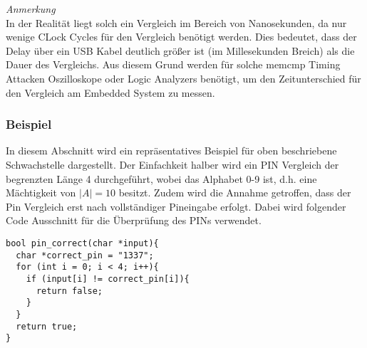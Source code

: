 \documentclass[a4paper,
DIV=13,
12pt,
BCOR=10mm,
department=FakIM,
oneside,
parskip=half,
automark,
listof=totocnumbered,
bibliography=totocnumbered,
acronym=totocnumbered
] {OTHRartcl}
\begin{document}
\textit{Anmerkung} \mbox{} \\
In der Realität liegt solch ein Vergleich im Bereich von Nanosekunden, da nur wenige CLock Cycles für den Vergleich benötigt werden.
Dies bedeutet, dass der Delay über ein USB Kabel deutlich größer ist (im Millesekunden Breich) als die Dauer des Vergleichs.
Aus diesem Grund werden für solche memcmp Timing Attacken Oszilloskope oder Logic Analyzers benötigt, um den Zeitunterschied
für den Vergleich am Embedded System zu messen.

\subsubsection{Beispiel}
In diesem Abschnitt wird ein repräsentatives Beispiel für oben beschriebene Schwachstelle dargestellt.
Der Einfachkeit halber wird ein PIN Vergleich der begrenzten Länge 4 durchgeführt, wobei das Alphabet 0-9 ist, d.h. eine Mächtigkeit von $|A| = 10$ besitzt.
Zudem wird die Annahme getroffen, dass der Pin Vergleich erst nach vollständiger Pineingabe erfolgt. Dabei
wird folgender Code Ausschnitt für die Überprüfung des PINs verwendet.
\begin{verbatim}
bool pin_correct(char *input){
  char *correct_pin = "1337";
  for (int i = 0; i < 4; i++){
    if (input[i] != correct_pin[i]){
      return false;
    }
  }
  return true;
}
\end{verbatim}
\end{document}
